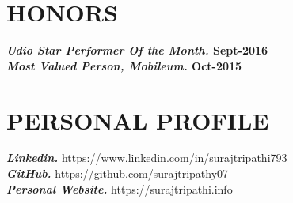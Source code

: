 \documentclass[line, margin]{res}
\begin{document}
\begin{resume}
\section{HONORS}
\textbf{\textit{Udio Star Performer Of the Month.} \hfill Sept-2016} \\ 
\textbf{\textit{Most Valued Person, Mobileum.} \hfill Oct-2015} \\ 
\section{PERSONAL PROFILE}

\textbf{\textit{Linkedin.}} https://www.linkedin.com/in/surajtripathi793 \\
\textbf{\textit{GitHub.}} https://github.com/surajtripathy07  \\
\textbf{\textit{Personal Website.}} https://surajtripathi.info\\
\end{resume}
\end{document}
